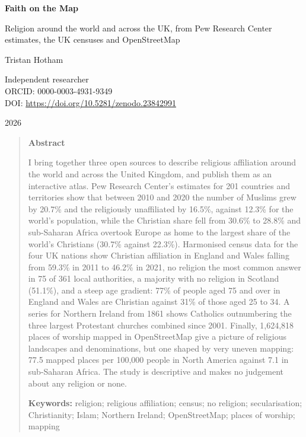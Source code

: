 \documentclass[11pt,a4paper]{article}
\begin{document}
\begin{center}
{\Large\bfseries Faith on the Map\par}
\vspace{0.4em}
{\large Religion around the world and across the UK, from Pew Research Center\\estimates, the UK censuses and OpenStreetMap\par}
\vspace{1.2em}
{\large Tristan Hotham\par}
\vspace{0.3em}
{\small Independent researcher\\
ORCID: 0000-0003-4931-9349\\
DOI: \href{https://doi.org/10.5281/zenodo.23842991}{https://doi.org/10.5281/zenodo.23842991}\par}
\vspace{0.8em}
2026
\end{center}

\begin{quote}
\small
\begin{center}\textbf{Abstract}\end{center}
I bring together three open sources to describe religious affiliation around the world and across the United Kingdom, and publish them as an interactive atlas. Pew Research Center's estimates for 201 countries and territories show that between 2010 and 2020 the number of Muslims grew by 20.7\% and the religiously unaffiliated by 16.5\%, against 12.3\% for the world's population, while the Christian share fell from 30.6\% to 28.8\% and sub-Saharan Africa overtook Europe as home to the largest share of the world's Christians (30.7\% against 22.3\%). Harmonised census data for the four UK nations show Christian affiliation in England and Wales falling from 59.3\% in 2011 to 46.2\% in 2021, no religion the most common answer in 75 of 361 local authorities, a majority with no religion in Scotland (51.1\%), and a steep age gradient: 77\% of people aged 75 and over in England and Wales are Christian against 31\% of those aged 25 to 34. A series for Northern Ireland from 1861 shows Catholics outnumbering the three largest Protestant churches combined since 2001. Finally, 1,624,818 places of worship mapped in OpenStreetMap give a picture of religious landscapes and denominations, but one shaped by very uneven mapping: 77.5 mapped places per 100,000 people in North America against 7.1 in sub-Saharan Africa. The study is descriptive and makes no judgement about any religion or none.

\textbf{Keywords:} religion; religious affiliation; census; no religion; secularisation; Christianity; Islam; Northern Ireland; OpenStreetMap; places of worship; mapping
\end{quote}
\end{document}
